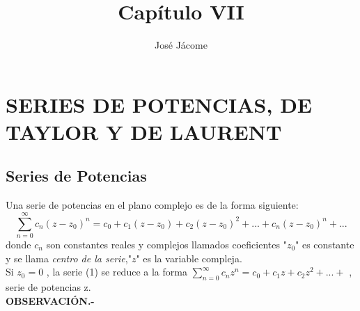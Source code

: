 \documentclass[10pt,a4paper]{article}
\author{José Jácome}
\title{Capítulo VII}
\begin{document}
\section{SERIES DE POTENCIAS, DE TAYLOR Y DE LAURENT}
\subsection{Series de Potencias}
Una serie de potencias en el plano complejo es de la forma siguiente:
\begin{equation}
\sum_{n = 0}^{\infty} c_n (z-z_0)^n = c_0 + c_1(z-z_0) + c_2 (z-z_0)^2 + ... +  c_n (z-z_0)^n + ...
\end{equation}
donde $c_n$ son constantes reales y complejos llamados coeficientes "$z_0$" es constante y se llama \textit{centro de la serie},"$z$" es la variable compleja. \\
Si $z_0 = 0$ , la serie (1) se reduce a la forma $\displaystyle{\sum_{n = 0}^{\infty} c_n z^n = c_0 + c_1 z + c_2 z^2 + ... + }$ , serie de potencias z.\\
\textbf{OBSERVACIÓN.-}
\end{document}
